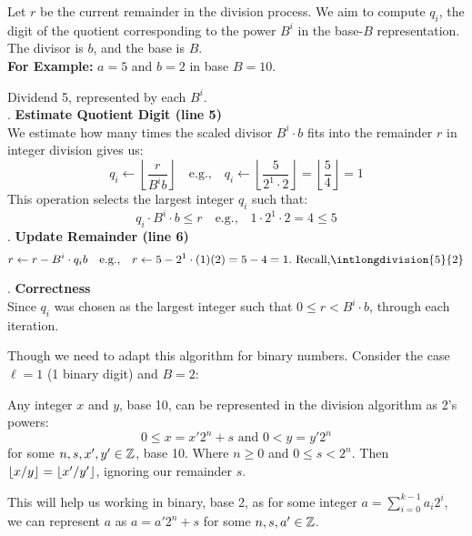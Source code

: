 \newpage

\begin{Proof}
    
    Let $r$ be the current remainder in the division process. We aim to compute $q_i$, the digit of the quotient corresponding to the power $B^i$ in the base-$B$ representation. The divisor is $b$, and the base is $B$.\\

    \noindent
    \textbf{For Example:} $a = 5$ and $b = 2$ in base $B = 10$.

    \noindent
    Dividend 5, represented by each $B^i$.\\

    . \textbf{Estimate Quotient Digit (line 5)}\\
    We estimate how many times the scaled divisor $B^i \cdot b$ fits into the remainder $r$ in integer division gives us:
    \[
    q_i \gets \left\lfloor \frac{r}{B^i b} \right\rfloor \quad \text{e.g.,} \quad q_i \gets \left\lfloor \frac{5}{2^1 \cdot 2} \right\rfloor = \left\lfloor \frac{5}{4} \right\rfloor = 1
    \]
    This operation selects the largest integer $q_i$ such that:
    \[
    q_i \cdot B^i \cdot b \leq r \quad \text{e.g.,} \quad 1 \cdot 2^1 \cdot 2 = 4 \leq 5
    \]
    . \textbf{Update Remainder (line 6)}\\
    \[
    r \gets r - B^i \cdot q_ib \quad \text{e.g.,} \quad r \gets 5 - 2^1 \cdot (1)(2) = 5 - 4 = 1.\text{ Recall,} \intlongdivision{5}{2}
    \]

    . \textbf{Correctness}\\
    Since $q_i$ was chosen as the largest integer such that $0 \leq r < B^i \cdot b$, through each iteration.

\end{Proof}
\noindent
Though we need to adapt this algorithm for binary numbers. Consider the case $\ell=1$ (1 binary digit) and $B=2$:

\begin{theo}
    
    Any integer $x$ and $y$, base 10, can be represented in the division algorithm as 2's powers:
    \[0\leq x=x'2^n+s \text{ and } 0 < y = y'2^n\]
    \noindent
    for some $n,s,x',y'\in\Z$, base 10. Where $n\geq 0$ and $0\leq s < 2^n$. Then $\floor*{x/y}=\floor*{x'/y'}$, ignoring our remainder $s$.

\end{theo}
\noindent
This will help us working in binary, base 2, as for some integer $a=\sum_{i=0}^{k-1}a_i2^i$, we can represent $a$ as $a=a'2^n+s$ for some $n,s,a'\in\Z$.

